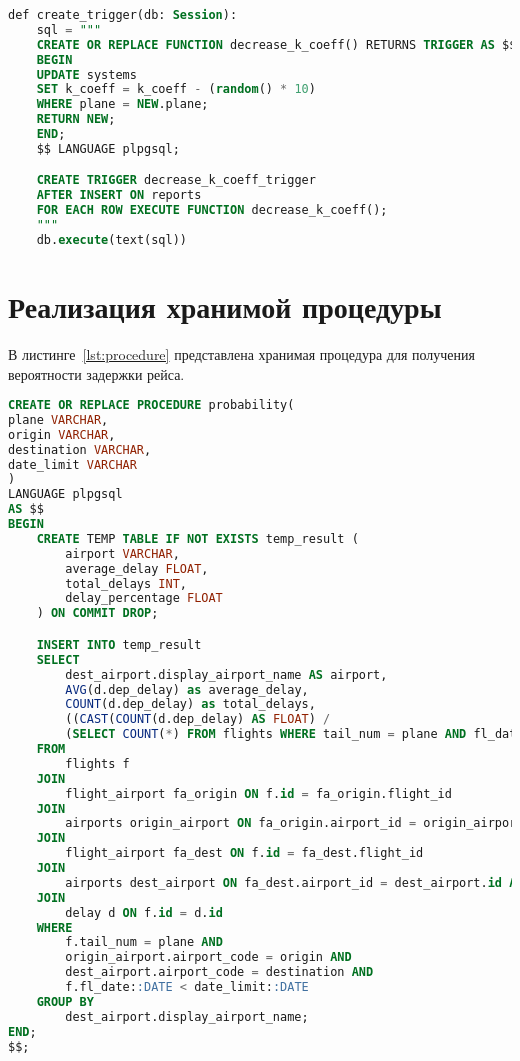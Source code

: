\begin{lstlisting}[label=lst:trigger, caption=Триггер для обновления данных в таблице system, language=SQL]
def create_trigger(db: Session):
    sql = """
    CREATE OR REPLACE FUNCTION decrease_k_coeff() RETURNS TRIGGER AS $$
    BEGIN
    UPDATE systems
    SET k_coeff = k_coeff - (random() * 10)
    WHERE plane = NEW.plane;
    RETURN NEW;
    END;
    $$ LANGUAGE plpgsql;

    CREATE TRIGGER decrease_k_coeff_trigger
    AFTER INSERT ON reports
    FOR EACH ROW EXECUTE FUNCTION decrease_k_coeff();
    """
    db.execute(text(sql))
\end{lstlisting}

\section{Реализация хранимой процедуры}
В листинге~\ref{lst:procedure} представлена хранимая процедура для получения вероятности задержки рейса.

\begin{lstlisting}[label=lst:procedure, caption=Хранимая процедура для получения вероятности задержки рейса, language=SQL]
CREATE OR REPLACE PROCEDURE probability(
plane VARCHAR,
origin VARCHAR,
destination VARCHAR,
date_limit VARCHAR
)
LANGUAGE plpgsql
AS $$
BEGIN
    CREATE TEMP TABLE IF NOT EXISTS temp_result (
        airport VARCHAR,
        average_delay FLOAT,
        total_delays INT,
        delay_percentage FLOAT
    ) ON COMMIT DROP;

    INSERT INTO temp_result
    SELECT
        dest_airport.display_airport_name AS airport,
        AVG(d.dep_delay) as average_delay,
        COUNT(d.dep_delay) as total_delays,
        ((CAST(COUNT(d.dep_delay) AS FLOAT) /
        (SELECT COUNT(*) FROM flights WHERE tail_num = plane AND fl_date::DATE < date_limit::DATE)) * 100.0) as delay_percentage
    FROM
        flights f
    JOIN
        flight_airport fa_origin ON f.id = fa_origin.flight_id
    JOIN
        airports origin_airport ON fa_origin.airport_id = origin_airport.id AND fa_origin.airport_type = 'departure'
    JOIN
        flight_airport fa_dest ON f.id = fa_dest.flight_id
    JOIN
        airports dest_airport ON fa_dest.airport_id = dest_airport.id AND fa_dest.airport_type = 'arrival'
    JOIN
        delay d ON f.id = d.id
    WHERE
        f.tail_num = plane AND
        origin_airport.airport_code = origin AND
        dest_airport.airport_code = destination AND
        f.fl_date::DATE < date_limit::DATE
    GROUP BY
        dest_airport.display_airport_name;
END;
$$;
\end{lstlisting}

